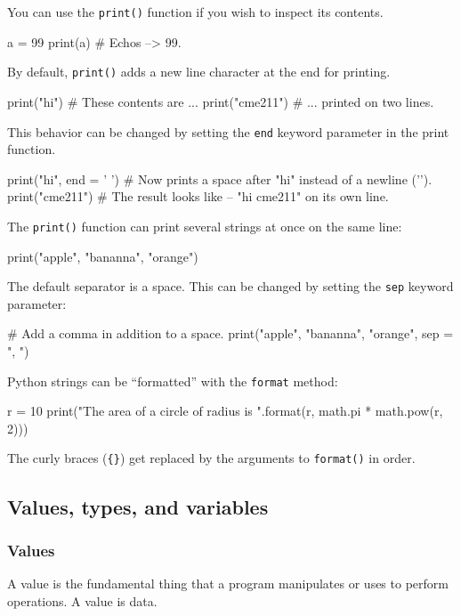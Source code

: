 \documentclass[12pt,letterpaper,twoside]{article}
\begin{document}
You can use the \texttt{print()} function if you wish to inspect its contents.
\begin{python}
a = 99
print(a)    # Echos --> 99.
\end{python}

By default, \texttt{print()} adds a new line character at the end for
printing.

\begin{python}
print("hi")           # These contents are ...
print("cme211")       # ... printed on two lines.
\end{python}

This behavior can be changed by setting the \texttt{end} keyword
parameter in the print function.

\begin{python}
print("hi", end = ' ')  # Now prints a space after "hi" instead of a newline ('\n').
print("cme211")         # The result looks like -- "hi cme211" on its own line.
\end{python}

The \texttt{print()} function can print several strings at once on the
same line:

\begin{python}
print("apple", "bananna", "orange")
\end{python}

The default separator is a space. This can be changed by setting the
\texttt{sep} keyword parameter:

\begin{python}
# Add a comma in addition to a space.
print("apple", "bananna", "orange", sep = ", ")  
\end{python}

Python strings can be ``formatted'' with the \texttt{format} method:


\begin{python}
r = 10
print("The area of a circle of radius {} is {}".format(r, math.pi * math.pow(r, 2)))
\end{python}

The curly braces (\texttt{\{\}}) get replaced by the arguments to
\texttt{format()} in order.

\subsection{Values, types, and variables}

\subsubsection{Values}
A value is the fundamental thing that a program manipulates or uses to
perform operations. A value is data.
\end{document}
